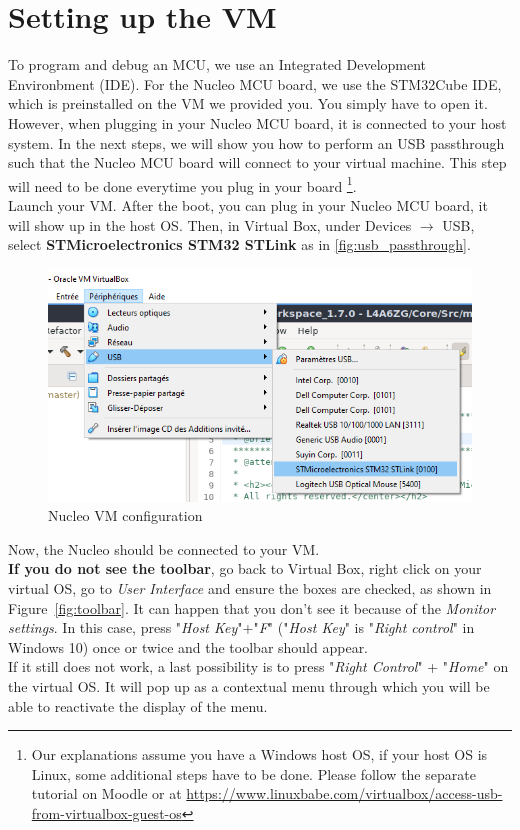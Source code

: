 \section{Setting up the VM}
To program and debug an MCU, we use an Integrated Development Environbment (IDE). For the Nucleo MCU board, we use the STM32Cube IDE, which is preinstalled on the VM we provided you. You simply have to open it. However, when plugging in your Nucleo MCU board, it is connected to your host system. In the next steps, we will show you how to perform an USB passthrough such that the Nucleo MCU board will connect to your virtual machine. This step will need to be done everytime you plug in your board \footnote{Our explanations assume you have a Windows host OS, if your host OS is Linux, some additional steps have to be done. Please follow the separate tutorial on Moodle or at \url{https://www.linuxbabe.com/virtualbox/access-usb-from-virtualbox-guest-os}}.\\

Launch your VM. After the boot, you can plug in your Nucleo MCU board, it will show up in the host OS. Then, in Virtual Box, under Devices $\rightarrow$ USB, select \textbf{STMicroelectronics STM32 STLink} as in \autoref{fig:usb_passthrough}.
\begin{figure}[H]
    \centering
    \includegraphics[scale=0.6]{figures/usb_passthrough.png}
    \caption{Nucleo VM configuration}
    \label{fig:usb_passthrough}
\end{figure}
Now, the Nucleo should be connected to your VM. \\
%
\textbf{If you do not see the toolbar}, go back to Virtual Box,
right click on your virtual OS, go to \emph{User Interface} and ensure the boxes are checked, as shown in Figure~\ref{fig:toolbar}. It can happen that you don't see it because of the \emph{Monitor settings}. In this case, press "\emph{Host Key}"+"\emph{F}" ("\emph{Host Key}" is "\emph{Right control}" in Windows 10) once or twice and the toolbar should appear. \\
If it still does not work, a last possibility is to press "\emph{Right Control}" + "\emph{Home}" on the virtual OS. It will pop up as a contextual menu through which you will be able to reactivate the display of the menu.

